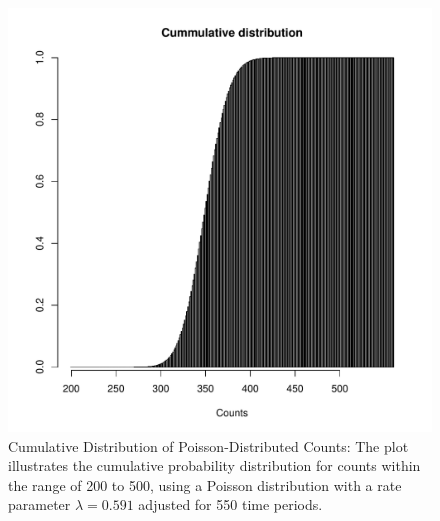 \begin{figure}
\begin{knitrout}
\color{fgcolor}

{\centering \includegraphics[width=\textwidth-3cm]{figure/ch02_figunnamed-chunk-5-1} 

}


\end{knitrout}
  \caption{Cumulative Distribution of Poisson-Distributed Counts: The plot illustrates the cumulative probability distribution for counts within the range of 200 to 500, using a Poisson distribution with a rate parameter $\lambda = 0.591$ adjusted for 550 time periods.}
  \label{fig:2_4}
\end{figure}


